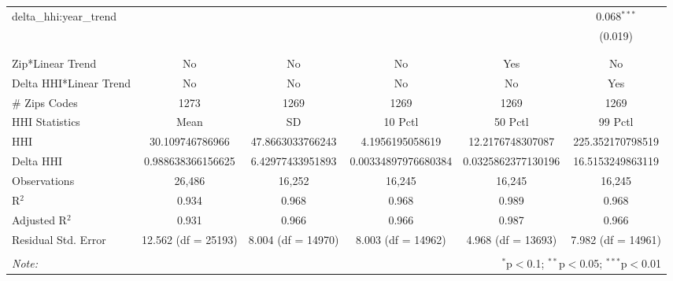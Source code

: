 \begin{table}[H]
{\begin{tabular}{@{\extracolsep{5pt}}lccccc}
  delta\_hhi:year\_trend &  &  &  &  & 0.068$^{***}$ \\  

   &  &  &  &  & (0.019) \\  

   & & & & & \\  

 \hline \\[-1.8ex]  

 Zip*Linear Trend & No & No & No & Yes & No \\  

 Delta HHI*Linear Trend & No & No & No & No & Yes \\  

 # Zips Codes & 1273 & 1269 & 1269 & 1269 & 1269 \\  

 HHI Statistics & Mean & SD & 10 Pctl & 50 Pctl & 99 Pctl \\  

 HHI & 30.109746786966 & 47.8663033766243 & 4.1956195058619 & 12.2176748307087 & 225.352170798519 \\  

 Delta HHI & 0.988638366156625 & 6.42977433951893 & 0.00334897976680384 & 0.0325862377130196 & 16.5153249863119 \\  

 Observations & 26,486 & 16,252 & 16,245 & 16,245 & 16,245 \\  

 R$^{2}$ & 0.934 & 0.968 & 0.968 & 0.989 & 0.968 \\  

 Adjusted R$^{2}$ & 0.931 & 0.966 & 0.966 & 0.987 & 0.966 \\  

 Residual Std. Error & 12.562 (df = 25193) & 8.004 (df = 14970) & 8.003 (df = 14962) & 4.968 (df = 13693) & 7.982 (df = 14961) \\  

 \hline  

 \hline \\[-1.8ex]  

 \textit{Note:}  & \multicolumn{5}{r}{$^{*}$p$<$0.1; $^{**}$p$<$0.05; $^{***}$p$<$0.01} \\  

 \end{tabular}}  

 \end{table}  

 


